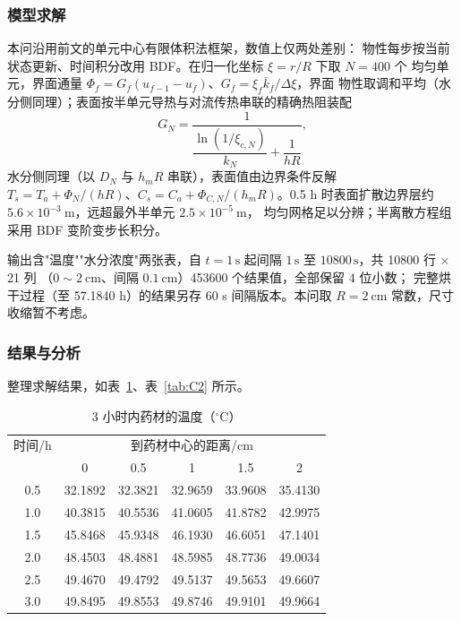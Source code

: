 \subsubsection{模型求解}

本问沿用前文的单元中心有限体积法框架\cite{taowenquan2001}，数值上仅两处差别：
物性每步按当前状态更新、时间积分改用 BDF。在归一化坐标 $\xi=r/R$ 下取 $N=400$ 个
均匀单元，界面通量 $\Phi_f=G_f(u_{f-1}-u_f)$、$G_f=\xi_f\bar k_f/\Delta\xi$，界面
物性取调和平均（水分侧同理）；表面按半单元导热与对流传热串联的精确热阻装配
\begin{equation}
  G_N=\frac{1}{\dfrac{\ln(1/\xi_{c,N})}{k_N}+\dfrac{1}{hR}},
  \label{eq:GN2}
\end{equation}
水分侧同理（以 $D_N$ 与 $h_mR$ 串联），表面值由边界条件反解
$T_s=T_a+\Phi_N/(hR)$、$C_s=C_a+\Phi_{C,N}/(h_mR)$。0.5 h 时表面扩散边界层约
$5.6\times10^{-3}\ \mathrm{m}$，远超最外半单元 $2.5\times10^{-5}\ \mathrm{m}$，
均匀网格足以分辨；半离散方程组采用 BDF 变阶变步长积分。

输出含"温度""水分浓度"两张表，自 $t=1\,\mathrm{s}$
起间隔 $1\,\mathrm{s}$ 至 $10800\,\mathrm{s}$，共 10800 行 $\times$ 21 列
（$0\sim2\ \mathrm{cm}$、间隔 $0.1\ \mathrm{cm}$）453600 个结果值，全部保留 4 位小数；
完整烘干过程（至 57.1840 h）的结果另存 60 s 间隔版本。本问取 $R=2\ \mathrm{cm}$
常数，尺寸收缩暂不考虑。

\subsubsection{结果与分析}

整理求解结果，如表~\ref{tab:T2}、表~\ref{tab:C2} 所示。

\begin{table}[htbp]
  \centering
  \caption{3 小时内药材的温度（$^{\circ}\mathrm{C}$）}
  \label{tab:T2}
  \begin{tabular}{cccccc}
    \hline
    时间/h & \multicolumn{5}{c}{到药材中心的距离/cm} \\
    & 0 & 0.5 & 1 & 1.5 & 2 \\
    \hline
    0.5 & 32.1892 & 32.3821 & 32.9659 & 33.9608 & 35.4130 \\
    1.0 & 40.3815 & 40.5536 & 41.0605 & 41.8782 & 42.9975 \\
    1.5 & 45.8468 & 45.9348 & 46.1930 & 46.6051 & 47.1401 \\
    2.0 & 48.4503 & 48.4881 & 48.5985 & 48.7736 & 49.0034 \\
    2.5 & 49.4670 & 49.4792 & 49.5137 & 49.5653 & 49.6607 \\
    3.0 & 49.8495 & 49.8553 & 49.8746 & 49.9101 & 49.9664 \\
    \hline
  \end{tabular}
\end{table}

